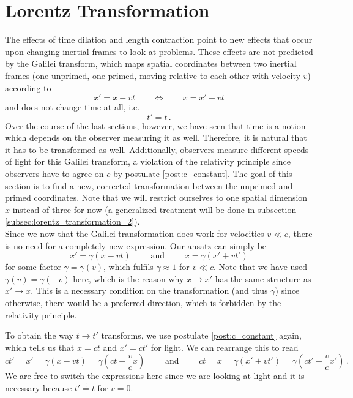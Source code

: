 \newpage



	\section{Lorentz Transformation}\label{sec:lorentz_transformation_1}
The effects of time dilation and length contraction point to new effects that occur upon changing inertial frames to look at problems. These effects are not predicted by the Galilei transform, which maps spatial coordinates between two inertial frames (one unprimed, one primed, moving relative to each other with velocity $v$) according to 
\begin{equation*}
	x' = x - v t
	\qquad \Leftrightarrow \qquad
	x = x' + v t
\end{equation*}
and does not change time at all, i.e.
\begin{equation*}
	t' = t \, .
\end{equation*}
Over the course of the last sections, however, we have seen that time is a notion which depends on the observer measuring it as well. Therefore, it is natural that it has to be transformed as well. Additionally, observers measure different speeds of light for this Galilei transform, a violation of the relativity principle since observers have to agree on $c$ by postulate \ref{post:c_constant}. The goal of this section is to find a new, corrected transformation between the unprimed and primed coordinates. Note that we will restrict ourselves to one spatial dimension $x$ instead of three for now (a generalized treatment will be done in subsection \ref{subsec:lorentz_transformation_2}).\\


Since we now that the Galilei transformation does work for velocities $v \ll c$, there is no need for a completely new expression. Our ansatz can simply be
\begin{equation}\label{eq:lorentz_spatial_ansatz}
	x' = \gamma (x - vt)
	\qquad \text{ and } \qquad
	x = \gamma (x' + vt')
\end{equation}
for some factor $\gamma = \gamma(v)$, which fulfils $\gamma \approx 1$ for $v \ll c$. Note that we have used $\gamma(v) = \gamma(-v)$ here, which is the reason why $x \rightarrow x'$ has the same structure as $x' \rightarrow x$. This is a necessary condition on the transformation (and thus $\gamma$) since otherwise, there would be a preferred direction, which is forbidden by the relativity principle.

To obtain the way $t \rightarrow t'$ transforms, we use postulate \ref{post:c_constant} again, which tells us that $x = ct$ and $x' = ct'$ for light. We can rearrange this to read
\begin{equation}\label{eq:lorentz_time_ansatz}
	ct' = x' = \gamma (x - vt) = \gamma (ct - \frac{v}{c} x)
	\qquad \text{ and } \qquad
	ct = x = \gamma (x' + vt') = \gamma (ct' + \frac{v}{c} x') \, .
\end{equation}
We are free to switch the expressions here since we are looking at light and it is necessary because $t' \overset{!}{=} t$ for $v = 0$.

